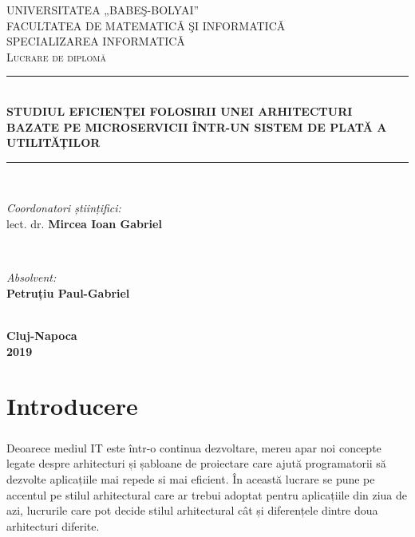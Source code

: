 \documentclass[12pt]{report}
\begin{document}
\begin{titlepage}
 
\newcommand{\HRule}{\rule{\linewidth}{0.5mm}} 
\center
\textsc{UNIVERSITATEA „BABEŞ-BOLYAI” \\
FACULTATEA DE MATEMATICǍ ŞI INFORMATICǍ \\
SPECIALIZAREA INFORMATICǍ}\\[5cm]
\textsc{\large Lucrare de diplomă}\\[0.5cm]

\HRule \\[0.4cm]
{\LARGE  \bfseries STUDIUL EFICIENȚEI FOLOSIRII UNEI ARHITECTURI BAZATE PE MICROSERVICII ÎNTR-UN SISTEM DE PLATĂ A UTILITĂȚILOR}\\[0.4cm]
\HRule \\[1.5cm]
 
\begin{minipage}{0.4\textwidth}
\begin{flushleft} \large
\emph{Coordonatori științifici:}\\
lect. dr. \textbf{Mircea Ioan Gabriel }
\end{flushleft}
\end{minipage}
~
\begin{minipage}{0.4\textwidth}
\begin{flushright} \large
\emph{Absolvent:} \\
\textbf{Petruțiu Paul-Gabriel} 
\end{flushright}
\end{minipage}\\[6cm]
 
{\large \textbf{Cluj-Napoca}}\\[2mm]
{\large \textbf{2019}}
\vfill
\end{titlepage}

\tableofcontents
\cleardoublepage
\listoffigures

\chapter{Introducere}
	\paragraph{}Deoarece mediul IT este într-o continua dezvoltare, mereu apar noi concepte legate despre arhitecturi și șabloane de proiectare care ajută programatorii să dezvolte aplicațiile mai repede si mai eficient. În această lucrare se pune pe accentul pe stilul arhitectural care ar trebui adoptat pentru aplicațiile din ziua de azi, lucrurile care pot decide stilul arhitectural cât și diferențele dintre doua arhitecturi diferite.
\end{document}
